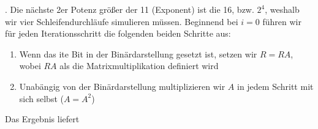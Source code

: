 \documentclass[course=erap]{aspdoc}
\begin{document}
\begin{math}
    \end{math}.  Die nächste 2er Potenz größer der 11 (Exponent) ist die 16, bzw. $2^{4}$, weshalb wir vier Schleifendurchläufe simulieren müssen. Beginnend bei \begin{math}
                                                                                                                                                                     i = 0
    \end{math} führen wir für jeden Iterationsschritt die folgenden beiden Schritte aus: \begin{enumerate}
                                                                                             \item Wenn das ite Bit in der Binärdarstellung gesetzt ist, setzen wir \begin{math}
                                                                                                                                                                        R = RA
                                                                                             \end{math},  wobei \begin{math}
                                                                                                                    RA
                                                                                             \end{math} als die Matrixmultiplikation definiert wird
                                                                                             \item Unabängig von der Binärdarstellung multiplizieren wir \begin{math}
                                                                                                                                                             A
                                                                                             \end{math} in jedem Schritt mit sich selbst (\begin{math}
                                                                                                                                              A = A^2
                                                                                             \end{math})
    \end{enumerate} Das Ergebnis liefert \begin{math}

\end{math}
\end{document}
